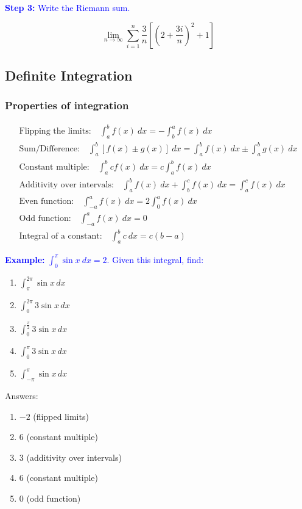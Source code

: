 \documentclass[letterpaper, 12pt]{article}
\newcommand{\example}[1]{\textcolor{blue}{\textbf{Example:} #1}}
\newcommand{\step}[2]{\textcolor{blue}{\textbf{Step #1:} #2}}
\begin{document}
\step{3}{Write the Riemann sum.}

$$\boxed{\lim_{n \to \infty} \sum_{i=1}^{n} \frac{3}{n} \left[ \left(2 + \frac{3i}{n}\right)^2 + 1 \right]}$$

\subsection*{Definite Integration}

\subsubsection*{Properties of integration}

\begin{gather*}
\text{Flipping the limits:} \quad \int_{a}^{b} f(x) \: dx = -\int_{b}^{a} f(x) \: dx \\
\text{Sum/Difference:} \quad \int_{a}^{b} [f(x) \pm g(x)] \: dx = \int_{a}^{b} f(x) \: dx \pm \int_{a}^{b} g(x) \: dx \\
\text{Constant multiple:} \quad \int_{a}^{b} c f(x) \: dx = c \int_{a}^{b} f(x) \: dx \\
\text{Additivity over intervals:} \quad \int_{a}^{b} f(x) \: dx + \int_{b}^{c} f(x) \: dx = \int_{a}^{c} f(x) \: dx \\
\text{Even function:} \quad \int_{-a}^{a} f(x) \: dx = 2 \int_{0}^{a} f(x) \: dx \\
\text{Odd function:} \quad \int_{-a}^{a} f(x) \: dx = 0 \\
\text{Integral of a constant:} \quad \int_{a}^{b} c \: dx = c(b - a)
\end{gather*}

\example{$\displaystyle \int_0^\pi \sin x \: dx = 2$. Given this integral, find:}

\begin{enumerate}[label=\alph*)]
\item $\displaystyle \int_{\pi}^{2\pi} \sin x \, dx$
\item $\displaystyle \int_0^{2\pi} 3 \sin x \, dx$
\item $\displaystyle \int_0^{\frac{\pi}{2}} 3 \sin x \, dx$
\item $\displaystyle \int_0^{\pi} 3 \sin x \, dx$
\item $\displaystyle \int_{-\pi}^{\pi} \sin x \, dx$
\end{enumerate}

Answers:

\begin{enumerate}[label=\alph*)]
\item $-2$ (flipped limits)
\item $6$ (constant multiple)
\item $3$ (additivity over intervals)
\item $6$ (constant multiple)
\item $0$ (odd function)
\end{enumerate}
\end{document}
